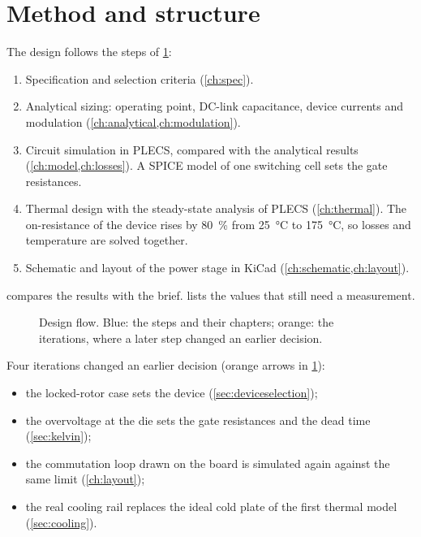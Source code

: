 \section{Method and structure}

The design follows the steps of \cref{fig:flow}:
\begin{enumerate}
  \item Specification and selection criteria (\cref{ch:spec}).
  \item Analytical sizing: operating point, DC-link capacitance, device
        currents and modulation (\cref{ch:analytical,ch:modulation}).
  \item Circuit simulation in PLECS, compared with the analytical results
        (\cref{ch:model,ch:losses}). A SPICE model of one switching cell sets
        the gate resistances.
  \item Thermal design with the steady-state analysis of PLECS
        (\cref{ch:thermal}). The on-resistance of the device rises by
        \SI{80}{\percent} from \SI{25}{\celsius} to \SI{175}{\celsius}, so
        losses and temperature are solved together.
  \item Schematic and layout of the power stage in KiCad
        (\cref{ch:schematic,ch:layout}).
\end{enumerate}
 compares the results with the brief.
 lists the values that still need a measurement.

\begin{figure}[H]
\centering

\caption{Design flow. Blue: the steps and their chapters; orange: the
iterations, where a later step changed an earlier decision.}
\label{fig:flow}
\end{figure}

Four iterations changed an earlier decision (orange arrows in
\cref{fig:flow}):
\begin{itemize}
  \item the locked-rotor case sets the device (\cref{sec:deviceselection});
  \item the overvoltage at the die sets the gate resistances and the dead
        time (\cref{sec:kelvin});
  \item the commutation loop drawn on the board is simulated again against
        the same limit (\cref{ch:layout});
  \item the real cooling rail replaces the ideal cold plate of the first
        thermal model (\cref{sec:cooling}).
\end{itemize}
